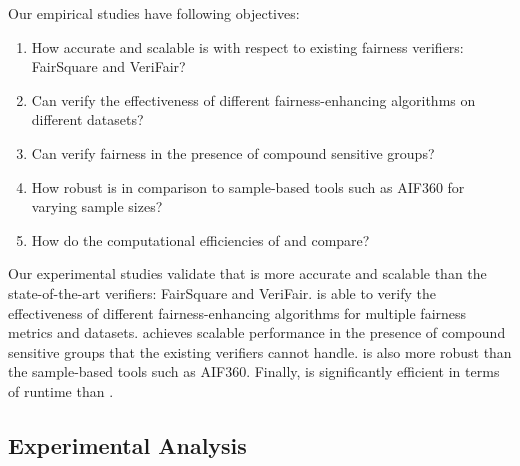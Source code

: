 Our empirical studies have following objectives:

\begin{enumerate}
	\item How accurate and scalable {\justicia} is with respect to existing fairness verifiers: FairSquare and VeriFair?
	\item Can {\justicia} verify the effectiveness of different fairness-enhancing algorithms on different datasets?
	\item Can {\justicia} verify fairness in the presence of compound sensitive groups?
	\item How robust is {\justicia} in comparison to sample-based tools such as AIF360 for varying sample sizes?
	\item How do the computational efficiencies of {\justicialearn} and {\justiciaenum} compare?
\end{enumerate}



Our experimental studies validate that {\justicia} is more accurate and scalable than the state-of-the-art verifiers: FairSquare and VeriFair. {\justicia} is able to verify the effectiveness of different fairness-enhancing algorithms for multiple fairness metrics and datasets. {\justicia} achieves scalable performance in the presence of compound sensitive groups that the existing verifiers cannot handle.  {\justicia} is also more robust than the sample-based tools such as AIF360.
Finally, {\justicialearn} is significantly efficient in terms of runtime than {\justiciaenum}.


\subsection{Experimental Analysis}



